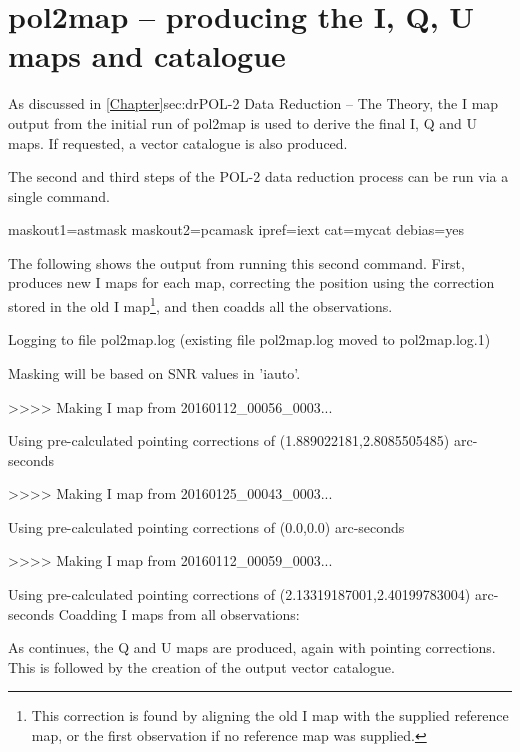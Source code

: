 \section{pol2map -- producing the I, Q, U maps and catalogue}
\label{sec:how-step23}

As discussed in \cref{Chapter}{sec:dr}{POL-2 Data Reduction -- The
  Theory}, the I map output from the initial run of pol2map is used to
derive the final I, Q and U maps. If requested, a vector catalogue is
also produced.

The second and third steps of the POL-2 data reduction process can be
run via a single command.

\begin{terminalv}
          maskout1=astmask maskout2=pcamask ipref=iext cat=mycat debias=yes
\end{terminalv}

The following shows the output from running this second 
command. First,  produces new I maps for each map, correcting
the position using the correction stored in the old I
map\footnote{This correction is found by aligning the old I map with the
supplied reference map, or the first observation if no reference map was
supplied.}, and then coadds all the observations.

\begin{terminalv}
Logging to file pol2map.log
(existing file pol2map.log moved to pol2map.log.1)

Masking will be based on SNR values in 'iauto'.

>>>>   Making I map from 20160112_00056_0003...

   Using pre-calculated pointing corrections of (1.889022181,2.8085505485) arc-seconds

>>>>   Making I map from 20160125_00043_0003...

   Using pre-calculated pointing corrections of (0.0,0.0) arc-seconds

>>>>   Making I map from 20160112_00059_0003...

   Using pre-calculated pointing corrections of (2.13319187001,2.40199783004) arc-seconds
Coadding I maps from all observations:
\end{terminalv}

As  continues, the Q and U maps are produced, again with
pointing corrections. This is followed by the creation of the output
vector catalogue.

